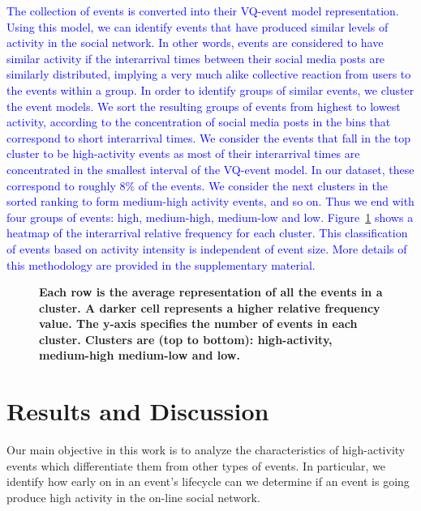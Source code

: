 \documentclass[10pt,letterpaper]{article}
\newcommand{\newtext}[1]{{\leavevmode\color{blue}#1}}
\begin{document}
\textcolor{blue}{The collection of events is converted into their VQ-event model
representation. Using this model, we can identify events that have
produced similar levels of activity in the social network. In other
words, events are considered to have similar activity if the
interarrival times between their social media posts are similarly
distributed, implying a very much alike collective reaction from users
to the events within a group. In order to identify groups of similar
events, we cluster the event models. We sort the resulting groups of
events from highest to lowest activity, according to the concentration
of social media posts in the bins that correspond to short
interarrival times. We consider the events that fall in the top
cluster to be high-activity events as most of their interarrival times
are concentrated in the smallest interval of the VQ-event model.  In
our dataset, these correspond to roughly 8\% of the events.  We
consider the next clusters in the sorted ranking to form medium-high
activity events, and so on.  Thus we end with four groups of events:
high, medium-high, medium-low and low. Figure~\ref{fig:fig3} shows a
heatmap of the interarrival relative frequency for each cluster. This
classification of events based on activity intensity is independent of
event size. More details of this methodology are provided in the
supplementary material.}

\begin{figure}
  \caption{\textbf{Each row is the average representation of all the
      events in a cluster.  A darker cell represents a higher
      relative frequency value.  The y-axis specifies the number of events in
      each
      cluster.  Clusters are (top to bottom): high-activity, medium-high
      medium-low and low.}
  }
  \label{fig:fig3}
\end{figure}

\section*{Results and Discussion}
Our main objective in this work is to analyze the
  characteristics of high-activity events which differentiate them from
  other types of events. In particular, we identify how early on in an
  event's lifecycle can we determine if an event is going
  produce high activity in the on-line social network.
\end{document}
